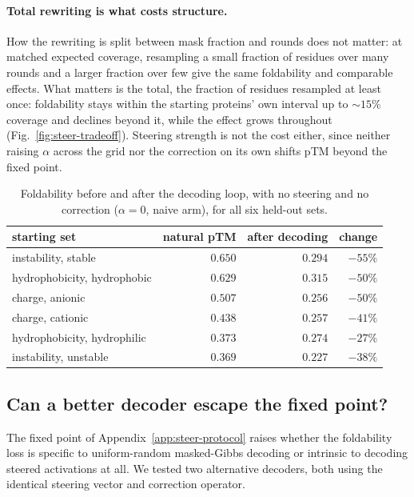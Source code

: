 \documentclass{article}
\begin{document}
\paragraph{Total rewriting is what costs structure.} How the rewriting is split between mask
fraction and rounds does not matter: at matched expected coverage, resampling a small fraction
of residues over many rounds and a larger fraction over few give the same foldability and
comparable effects. What matters is the total, the fraction of residues resampled at least once:
foldability stays within the starting proteins' own interval up to ${\sim}15\%$ coverage and
declines beyond it, while the effect grows throughout (Fig.~\ref{fig:steer-tradeoff}). Steering
strength is not the cost either, since neither raising $\alpha$ across the grid nor the
correction on its own shifts pTM beyond the fixed point.

\begin{table}[htbp]
\centering
\caption{Foldability before and after the decoding loop, with no steering and no correction
($\alpha{=}0$, naive arm), for all six held-out sets.}
\label{tab:steer-decode6}
\begin{tabular}{lrrr}
\toprule
starting set & natural pTM & after decoding & change \\
\midrule
instability, stable         & $0.650$ & $0.294$ & $-55\%$ \\
hydrophobicity, hydrophobic & $0.629$ & $0.315$ & $-50\%$ \\
charge, anionic             & $0.507$ & $0.256$ & $-50\%$ \\
charge, cationic            & $0.438$ & $0.257$ & $-41\%$ \\
hydrophobicity, hydrophilic & $0.373$ & $0.274$ & $-27\%$ \\
instability, unstable       & $0.369$ & $0.227$ & $-38\%$ \\
\bottomrule
\end{tabular}
\end{table}

\subsection{Can a better decoder escape the fixed point?}
\label{app:steer-decoders}

The fixed point of Appendix~\ref{app:steer-protocol} raises whether the foldability loss is specific to uniform-random masked-Gibbs decoding or intrinsic to decoding steered activations at all. We tested two alternative decoders, both using the identical steering vector and correction operator. 
\end{document}
